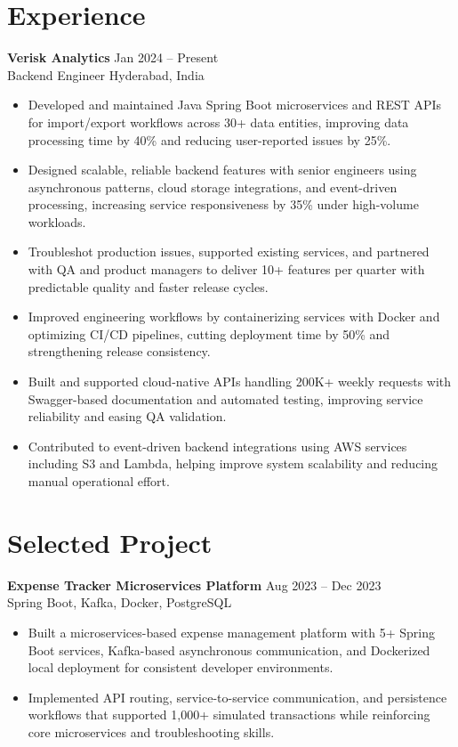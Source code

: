 \documentclass[10pt,letterpaper]{article}
\newcommand{\resumeSubheading}[4]{%
  \textbf{#1} \hfill #2 \\
  #3 \hfill #4 \\
}
\begin{document}
\section*{Experience}
\resumeSubheading{Verisk Analytics}{Jan 2024 -- Present}{Backend Engineer}{Hyderabad, India}
\begin{itemize}
    \item Developed and maintained Java Spring Boot microservices and REST APIs for import/export workflows across 30+ data entities, improving data processing time by 40\% and reducing user-reported issues by 25\%.
    \item Designed scalable, reliable backend features with senior engineers using asynchronous patterns, cloud storage integrations, and event-driven processing, increasing service responsiveness by 35\% under high-volume workloads.
    \item Troubleshot production issues, supported existing services, and partnered with QA and product managers to deliver 10+ features per quarter with predictable quality and faster release cycles.
    \item Improved engineering workflows by containerizing services with Docker and optimizing CI/CD pipelines, cutting deployment time by 50\% and strengthening release consistency.
    \item Built and supported cloud-native APIs handling 200K+ weekly requests with Swagger-based documentation and automated testing, improving service reliability and easing QA validation.
    \item Contributed to event-driven backend integrations using AWS services including S3 and Lambda, helping improve system scalability and reducing manual operational effort.
\end{itemize}

\section*{Selected Project}
\resumeSubheading{Expense Tracker Microservices Platform}{Aug 2023 -- Dec 2023}{}{Spring Boot, Kafka, Docker, PostgreSQL}
\begin{itemize}
    \item Built a microservices-based expense management platform with 5+ Spring Boot services, Kafka-based asynchronous communication, and Dockerized local deployment for consistent developer environments.
    \item Implemented API routing, service-to-service communication, and persistence workflows that supported 1,000+ simulated transactions while reinforcing core microservices and troubleshooting skills.
\end{itemize}
\end{document}
